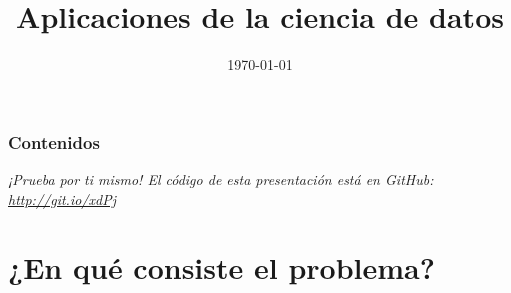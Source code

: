 \documentclass[8pt]{beamer}
\title[Ciencia de datos]{Aplicaciones de la ciencia de datos} %
\author[@ncordon \and @fdavidcl \and @M42] %
{\texorpdfstring{
    \begin{columns}
      \column{.25\linewidth}
      \centering
      Ignacio Cordón\\
      \href{http://www.github.com/ncordon}{@ncordon}
      \column{.25\linewidth}
      \centering
      David Charte\\
      \href{http://www.github.com/fdavidcl}{@fdavidcl}
      \column{.25\linewidth}
      \centering
      Mario Román\\
      \href{http://www.github.com/M42}{@M42}
    \end{columns}
}{Ignacio Cordón \and David Charte \and Mario Román}}
\institute[UGR] %
{
  Universidad de Granada \\ %
  \medskip
}
\date{\today} %
\begin{document}
\begin{frame}
\titlepage %
\end{frame}

\begin{frame}
  \frametitle{Contenidos} %
  \tableofcontents
  \textit{¡Prueba por ti mismo! El código de esta presentación está en GitHub: \url{http://git.io/xdPj}}
\end{frame}





\section{¿En qué consiste el problema?}
\end{document}
